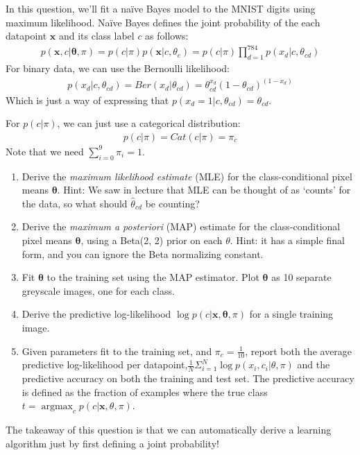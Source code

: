\documentclass{harvardml}
\newcommand{\bx}{\mathbf{x}}
\newcommand{\btheta}{\boldsymbol{\theta}}
\theoremstyle{plain}
\begin{document}
\begin{problem}

In this question, we'll fit a na\"ive Bayes model to the MNIST digits using maximum likelihood.
Na\"ive Bayes defines the joint probability of the each datapoint $\bx$ and its class label $c$ as follows:
%
\begin{align}
p(\bx, c | \btheta, \pi) = p(c | \pi) p(\bx | c, \theta_c) = p(c | \pi) \prod_{d=1}^{784} p( x_d | c, \theta_{cd})
\end{align}
For binary data, we can use the Bernoulli likelihood:
\begin{align}
p( x_d | c, \theta_{cd}) = Ber(x_d | \theta_{cd}) = \theta_{cd}^{x_d} ( 1 - \theta_{cd})^{(1 - x_d)}
\end{align}
Which is just a way of expressing that $p(x_d = 1 | c, \theta_{cd}) = \theta_{cd}$.

For $p(c | \pi)$, we can just use a categorical distribution:
\begin{align}
p(c | \pi) = Cat(c|\pi) = \pi_c
\end{align}
Note that we need $\sum_{i=0}^9 \pi_{i} = 1$.

\begin{enumerate}[label=(\alph*)]
\item Derive the \emph{maximum likelihood estimate} (MLE) for the class-conditional pixel means $\btheta$. Hint: We saw in lecture that MLE can be thought of as `counts' for the data, so what should $\hat \theta_{cd}$ be counting?
\item Derive the \emph{maximum a posteriori} (MAP) estimate for the class-conditional pixel means $\btheta$, using a Beta(2, 2) prior on each $\theta$.  Hint: it has a simple final form, and you can ignore the Beta normalizing constant.
\item Fit $\btheta$ to the training set using the MAP estimator.  Plot $\btheta$ as 10 separate greyscale images, one for each class.
\item Derive the predictive log-likelihood $\log p(c | \bx, \btheta, \pi)$ for a single training image.
\item Given parameters fit to the training set, and $\pi_c = \frac{1}{10}$, report both the average predictive log-likelihood per datapoint,$\frac{1}{N}\Sigma_{i=1}^N \log p(x_i ,c_i | \theta,\pi)$ and the predictive accuracy on both the training and test set.  The predictive accuracy is defined as the fraction of examples where the true class $t = \operatorname{argmax}_c p(c | \bx, \theta, \pi)$.
\end{enumerate}
The takeaway of this question is that we can automatically derive a learning algorithm just by first defining a joint probability!
\end{problem}
\end{document}

